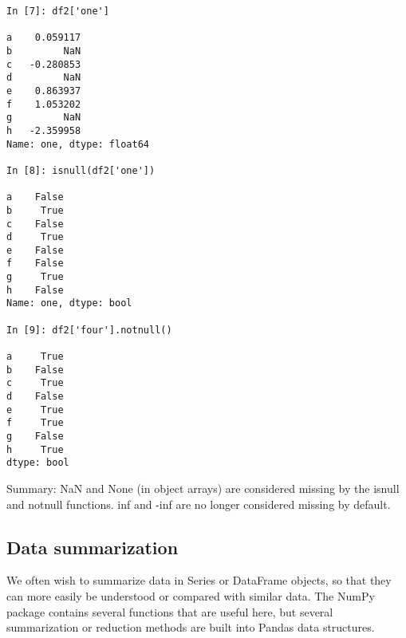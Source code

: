 \documentclass[11pt]{article} %
\begin{document}
\begin{verbatim}
In [7]: df2['one']

a    0.059117
b         NaN
c   -0.280853
d         NaN
e    0.863937
f    1.053202
g         NaN
h   -2.359958
Name: one, dtype: float64

In [8]: isnull(df2['one'])

a    False
b     True
c    False
d     True
e    False
f    False
g     True
h    False
Name: one, dtype: bool

In [9]: df2['four'].notnull()

a     True
b    False
c     True
d    False
e     True
f     True
g    False
h     True
dtype: bool
\end{verbatim}
Summary: NaN and None (in object arrays) are considered missing by the isnull and notnull functions. inf and -inf are no longer considered missing by default.
\newpage
\subsection{Data summarization}
We often wish to summarize data in Series or DataFrame objects, so that they can more easily be understood or compared with similar data. The NumPy package contains several functions that are useful here, but several summarization or reduction methods are built into Pandas data structures.
\end{document}
